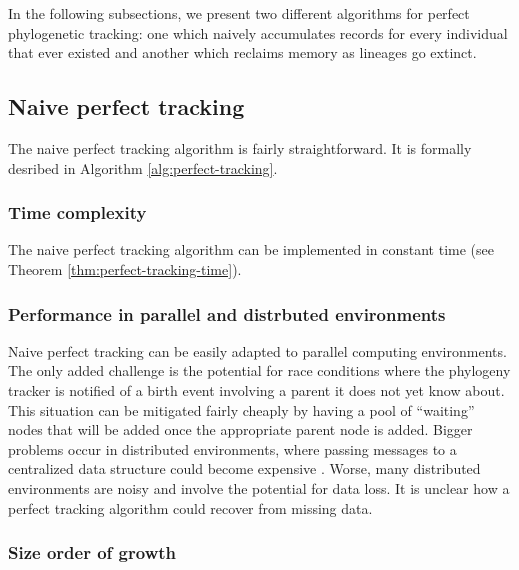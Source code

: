 In the following subsections, we present two different algorithms for perfect phylogenetic tracking: one which naively accumulates records for every individual that ever existed and another which reclaims memory as lineages go extinct.

\subsection{Naive perfect tracking}
\label{sec:naive-perfect-tracking}

The naive perfect tracking algorithm is fairly straightforward.
It is formally desribed in Algorithm \ref{alg:perfect-tracking}.



\subsubsection{Time complexity}

The naive perfect tracking algorithm can be implemented in constant time (see Theorem \ref{thm:perfect-tracking-time}).




\subsubsection{Performance in parallel and distrbuted environments}
\label{sec:perfect-tracking-distrbuted}

Naive perfect tracking can be easily adapted to parallel computing environments.
The only added challenge is the potential for race conditions where the phylogeny tracker is notified of a birth event involving a parent it does not yet know about.
This situation can be mitigated fairly cheaply by having a pool of ``waiting'' nodes that will be added once the appropriate parent node is added.
Bigger problems occur in distributed environments, where passing messages to a centralized data structure could become expensive \citep{moreno2022hereditary}.
Worse, many distributed environments are noisy and involve the potential for data loss.
It is unclear how a perfect tracking algorithm could recover from missing data.

\subsubsection{Size order of growth}


